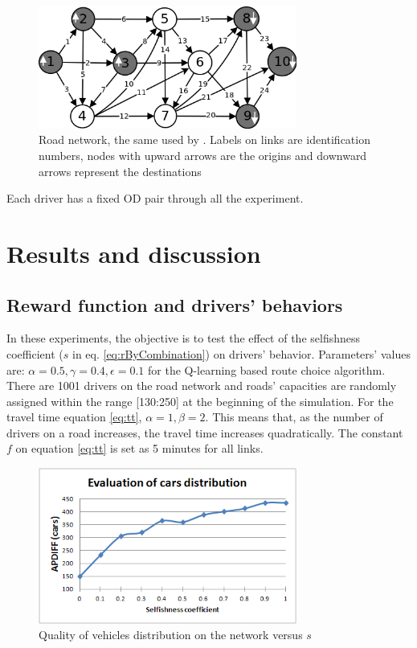 \documentclass[12pt]{article}
\begin{document}
\begin{figure}[ht]
    \centerline{\includegraphics[width=8.5cm]{img/roadnetwork.png}}
    \caption{Road network, the same used by \cite{Galib&Moser2011}. Labels on links are identification numbers, nodes with upward arrows are the origins and downward arrows represent the destinations}
    \label{fig:roadnetwork}
\end{figure}

Each driver has a fixed OD pair through all the experiment.%

\section{Results and discussion}
\label{sec:results}


\subsection{Reward function and drivers' behaviors}
In these experiments, the objective is to test the effect of the selfishness coefficient ($s$ in eq. \eqref{eq:rByCombination}) on drivers' behavior. Parameters' values are: $\alpha = 0.5, \gamma = 0.4, \epsilon = 0.1$ for the Q-learning based route choice algorithm. There are 1001 drivers on the road network and roads' capacities are randomly assigned within the range [130:250] at the beginning of the simulation. For the travel time equation \eqref{eq:tt}, $\alpha = 1, \beta = 2$. This means that, as the number of drivers on a road increases, the travel time increases quadratically. The constant $f$ on equation \eqref{eq:tt} is set as 5 minutes for all links.

\begin{figure}[ht]
    \centerline{\includegraphics[width=8.5cm]{img/carsDistribVersusS.png}}
    \caption{Quality of vehicles distribution on the network versus $s$}
    \label{fig:apdiff}
\end{figure}
\end{document}
